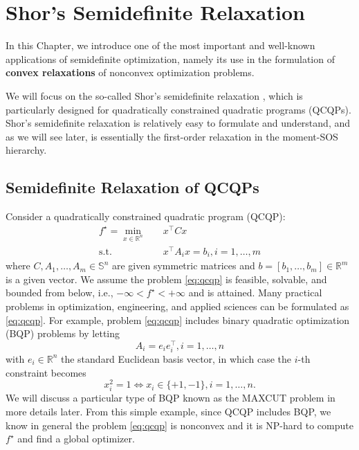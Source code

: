 \documentclass[
]{book}
\theoremstyle{definition}
\theoremstyle{definition}
\theoremstyle{definition}
\theoremstyle{definition}
\theoremstyle{remark}
\begin{document}
\citep{mansour09arxiv-domain}

\hypertarget{Shor}{%
\chapter{Shor's Semidefinite Relaxation}\label{Shor}}

In this Chapter, we introduce one of the most important and well-known applications of semidefinite optimization, namely its use in the formulation of \textbf{convex relaxations} of nonconvex optimization problems.

We will focus on the so-called Shor's semidefinite relaxation \citep{shor87sjcss-quadratic}, which is particularly designed for quadratically constrained quadratic programs (QCQPs). Shor's semidefinite relaxation is relatively easy to formulate and understand, and as we will see later, is essentially the first-order relaxation in the moment-SOS hierarchy.

\hypertarget{semidefinite-relaxation-of-qcqps}{%
\section{Semidefinite Relaxation of QCQPs}\label{semidefinite-relaxation-of-qcqps}}

Consider a quadratically constrained quadratic program (QCQP):
\begin{equation}
\begin{split}
f^\star = \min_{x \in \mathbb{R}^{n}} & \quad x^\top C x \\
\mathrm{s.t.}& \quad x^\top A_i x = b_i, i=1,\dots,m
\end{split}
\label{eq:qcqp}
\end{equation}
where \(C,A_1,\dots,A_m \in \mathbb{S}^{n}\) are given symmetric matrices and \(b = [b_1,\dots,b_m] \in \mathbb{R}^{m}\) is a given vector. We assume the problem \eqref{eq:qcqp} is feasible, solvable, and bounded from below, i.e., \(-\infty < f^\star < +\infty\) and is attained. Many practical problems in optimization, engineering, and applied sciences can be formulated as \eqref{eq:qcqp}. For example, problem \eqref{eq:qcqp} includes binary quadratic optimization (BQP) problems by letting
\[
A_i = e_i e_i^\top, i=1,\dots,n
\]
with \(e_i \in \mathbb{R}^{n}\) the standard Euclidean basis vector, in which case the \(i\)-th constraint becomes
\[
x_i^2 = 1 \Leftrightarrow x_i \in \{+1,-1\},i=1,\dots,n.
\]
We will discuss a particular type of BQP known as the MAXCUT problem in more details later. From this simple example, since QCQP includes BQP, we know in general the problem \eqref{eq:qcqp} is nonconvex and it is NP-hard to compute \(f^\star\) and find a global optimizer.
\end{document}
